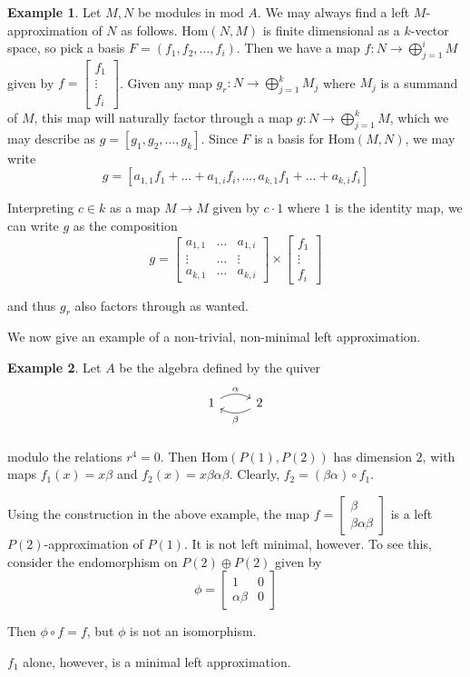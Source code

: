 \documentclass[]{article}
\theoremstyle{definition}
\newtheorem{example}{Example}[section]
\begin{document}
\begin{example}
	Let $M,N$ be modules in $\text{mod } A$. We may always find a left $M$-approximation of $N$ as follows. $\text{Hom}(N,M)$ is finite dimensional as a $k$-vector space, so pick a basis $F = (f_1,f_2,\dots,f_i)$. Then we have a map $f:N \to \bigoplus_{j= 1}^i M$ given by $f = \begin{bmatrix}
	f_1 \\ \vdots \\ f_i
	\end{bmatrix}$. Given any map $g_r:N \to \bigoplus_{j = 1}^k M_j$ where $M_j$ is a summand of $M$, this map will naturally factor through a map $g:N \to \bigoplus_{j = 1}^k M$, which we may describe as $g = [g_1,g_2,\dots,g_k]$. Since $F$ is a basis for $\text{Hom}(M,N)$, we may write \[g = [a_{1,1}f_1 + \dots + a_{1,i}f_i,\dots,a_{k,1}f_1 + \dots + a_{k,i}f_i]\]
	
	Interpreting $c \in k$ as a map $M \to M$ given by $c \cdot1$ where $1$ is the identity map, we can write $g$ as the composition
	\[g = \begin{bmatrix}
	a_{1,1} & \dots & a_{1,i} \\
	\vdots & \dots & \vdots \\
	a_{k,1} & \dots & a_{k,i}
	\end{bmatrix} \times \begin{bmatrix}
	f_1 \\ \vdots \\ f_i
	\end{bmatrix}
	\]
	
	and thus $g_r$ also factors through as wanted.
\end{example}

We now give an example of a non-trivial, non-minimal left approximation.

\begin{example}
	Let $A$ be the algebra defined by the quiver
	\[
	\begin{tikzcd}
	1 \arrow[r,bend left,"\alpha"] & 2 \arrow[l,bend left,"\beta"]  \\
	\end{tikzcd}
	\]
	
	modulo the relations $r^4 = 0$. Then $\text{Hom}(P(1),P(2))$ has dimension $2$, with maps $f_1(x) = x \beta$ and $f_2(x) =  x\beta\alpha\beta$. Clearly, $f_2 = (\beta\alpha) \circ f_1$. 
	
	Using the construction in the above example, the map $f = \begin{bmatrix} \beta \\ \beta\alpha\beta \end{bmatrix}$ is a left $P(2)$-approximation of $P(1)$. It is not left minimal, however. To see this, consider the endomorphism on $P(2) \oplus P(2)$ given by \[\phi = \begin{bmatrix} 1 & 0 \\ \alpha\beta & 0\end{bmatrix}\]
	
	Then $\phi \circ f = f$, but $\phi$ is not an isomorphism. 
	
	$f_1$ alone, however, is a minimal left approximation.
\end{example}
\end{document}

